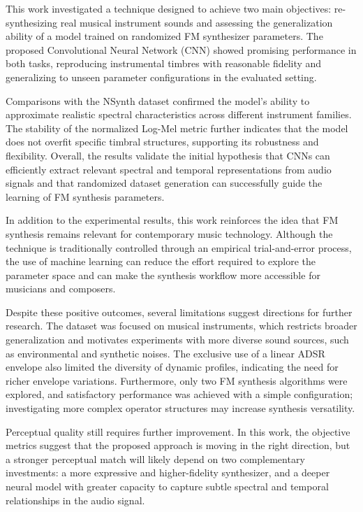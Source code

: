 This work investigated a technique designed to achieve two main objectives: re-synthesizing real musical instrument sounds and assessing the generalization ability of a model trained on randomized FM synthesizer parameters. The proposed Convolutional Neural Network (CNN) showed promising performance in both tasks, reproducing instrumental timbres with reasonable fidelity and generalizing to unseen parameter configurations in the evaluated setting.

Comparisons with the NSynth dataset confirmed the model’s ability to approximate realistic spectral characteristics across different instrument families. The stability of the normalized Log-Mel metric further indicates that the model does not overfit specific timbral structures, supporting its robustness and flexibility. Overall, the results validate the initial hypothesis that CNNs can efficiently extract relevant spectral and temporal representations from audio signals and that randomized dataset generation can successfully guide the learning of FM synthesis parameters.

In addition to the experimental results, this work reinforces the idea that FM synthesis remains relevant for contemporary music technology. Although the technique is traditionally controlled through an empirical trial-and-error process, the use of machine learning can reduce the effort required to explore the parameter space and can make the synthesis workflow more accessible for musicians and composers.

Despite these positive outcomes, several limitations suggest directions for further research. The dataset was focused on musical instruments, which restricts broader generalization and motivates experiments with more diverse sound sources, such as environmental and synthetic noises. The exclusive use of a linear ADSR envelope also limited the diversity of dynamic profiles, indicating the need for richer envelope variations. Furthermore, only two FM synthesis algorithms were explored, and satisfactory performance was achieved with a simple configuration; investigating more complex operator structures may increase synthesis versatility.

Perceptual quality still requires further improvement. In this work, the objective metrics suggest that the proposed approach is moving in the right direction, but a stronger perceptual match will likely depend on two complementary investments: a more expressive and higher-fidelity synthesizer, and a deeper neural model with greater capacity to capture subtle spectral and temporal relationships in the audio signal.

